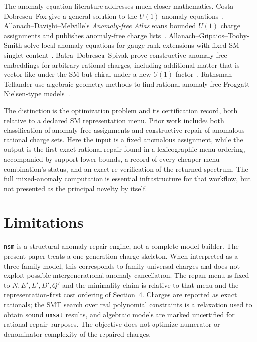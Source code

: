 \documentclass[11pt]{article}
\newcommand{\nsm}{\texttt{nsm}}
\begin{document}
The anomaly-equation literature addresses much closer mathematics.
Costa--Dobrescu--Fox give a general solution to the $U(1)$ anomaly
equations~\cite{u1solution}. Allanach--Davighi--Melville's
\emph{Anomaly-free Atlas} scans bounded $U(1)$ charge assignments and publishes
anomaly-free charge lists~\cite{anomalyatlas}. Allanach--Gripaios--Tooby-Smith
solve local anomaly equations for gauge-rank extensions with fixed SM-singlet
content~\cite{allanachsinglets}. Batra--Dobrescu--Spivak prove constructive
anomaly-free embeddings for arbitrary rational charges, including additional
matter that is vector-like under the SM but chiral under a new $U(1)$
factor~\cite{batra}. Rathsman--Tellander use algebraic-geometry methods to find
rational anomaly-free Froggatt--Nielsen-type models~\cite{rathsman}.

The distinction is the optimization problem and its certification record, both
relative to a declared SM representation menu. Prior work includes both
classification of anomaly-free assignments and constructive repair of anomalous
rational charge sets. Here the input is a fixed anomalous assignment, while the
output is the first exact rational repair found in a lexicographic menu ordering,
accompanied by support lower bounds, a record of every cheaper menu combination's
status, and an exact re-verification of the returned spectrum. The full
mixed-anomaly computation is essential infrastructure for that workflow, but not
presented as the principal novelty by itself.

\section{Limitations}
\label{sec:limits}

\nsm{} is a structural anomaly-repair engine, not a complete model builder. The
present paper treats a one-generation charge skeleton. When interpreted as a
three-family model, this corresponds to family-universal charges and does not
exploit possible intergenerational anomaly cancellation. The repair
menu is fixed to $N,E',L',D',Q'$ and the minimality claim is relative to that
menu and the representation-first cost ordering of Section~4. Charges are
reported as exact rationals; the SMT search over real polynomial constraints is
a relaxation used to obtain sound \texttt{unsat} results, and algebraic models
are marked uncertified for rational-repair purposes. The objective does not
optimize numerator or denominator complexity of the repaired charges.
\end{document}
